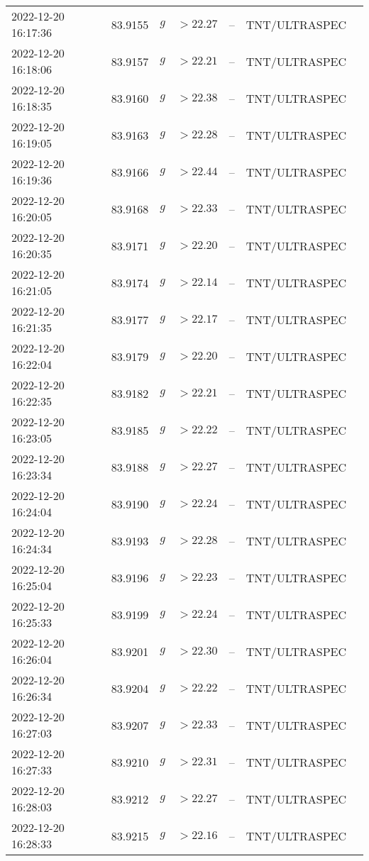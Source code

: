 \documentclass{nature_plusfigure}
\begin{document}
\begin{supplement}
\begin{center}
\begin{longtable}{lllllll}
2022-12-20 16:17:36 & 83.9155 & $g$ & $>22.27$ & -- & TNT/ULTRASPEC &  \\ 
2022-12-20 16:18:06 & 83.9157 & $g$ & $>22.21$ & -- & TNT/ULTRASPEC &  \\ 
2022-12-20 16:18:35 & 83.9160 & $g$ & $>22.38$ & -- & TNT/ULTRASPEC &  \\ 
2022-12-20 16:19:05 & 83.9163 & $g$ & $>22.28$ & -- & TNT/ULTRASPEC &  \\ 
2022-12-20 16:19:36 & 83.9166 & $g$ & $>22.44$ & -- & TNT/ULTRASPEC &  \\ 
2022-12-20 16:20:05 & 83.9168 & $g$ & $>22.33$ & -- & TNT/ULTRASPEC &  \\ 
2022-12-20 16:20:35 & 83.9171 & $g$ & $>22.20$ & -- & TNT/ULTRASPEC &  \\ 
2022-12-20 16:21:05 & 83.9174 & $g$ & $>22.14$ & -- & TNT/ULTRASPEC &  \\ 
2022-12-20 16:21:35 & 83.9177 & $g$ & $>22.17$ & -- & TNT/ULTRASPEC &  \\ 
2022-12-20 16:22:04 & 83.9179 & $g$ & $>22.20$ & -- & TNT/ULTRASPEC &  \\ 
2022-12-20 16:22:35 & 83.9182 & $g$ & $>22.21$ & -- & TNT/ULTRASPEC &  \\ 
2022-12-20 16:23:05 & 83.9185 & $g$ & $>22.22$ & -- & TNT/ULTRASPEC &  \\ 
2022-12-20 16:23:34 & 83.9188 & $g$ & $>22.27$ & -- & TNT/ULTRASPEC &  \\ 
2022-12-20 16:24:04 & 83.9190 & $g$ & $>22.24$ & -- & TNT/ULTRASPEC &  \\ 
2022-12-20 16:24:34 & 83.9193 & $g$ & $>22.28$ & -- & TNT/ULTRASPEC &  \\ 
2022-12-20 16:25:04 & 83.9196 & $g$ & $>22.23$ & -- & TNT/ULTRASPEC &  \\ 
2022-12-20 16:25:33 & 83.9199 & $g$ & $>22.24$ & -- & TNT/ULTRASPEC &  \\ 
2022-12-20 16:26:04 & 83.9201 & $g$ & $>22.30$ & -- & TNT/ULTRASPEC &  \\ 
2022-12-20 16:26:34 & 83.9204 & $g$ & $>22.22$ & -- & TNT/ULTRASPEC &  \\ 
2022-12-20 16:27:03 & 83.9207 & $g$ & $>22.33$ & -- & TNT/ULTRASPEC &  \\ 
2022-12-20 16:27:33 & 83.9210 & $g$ & $>22.31$ & -- & TNT/ULTRASPEC &  \\ 
2022-12-20 16:28:03 & 83.9212 & $g$ & $>22.27$ & -- & TNT/ULTRASPEC &  \\ 
2022-12-20 16:28:33 & 83.9215 & $g$ & $>22.16$ & -- & TNT/ULTRASPEC &  \\ 

\end{longtable}
\end{center}
\end{supplement}
\end{document}
